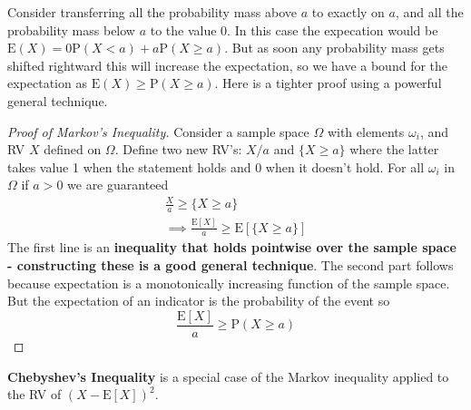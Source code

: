 Consider transferring all the probability mass above $a$ to exactly on $a$, and all the probability mass below $a$ to the value 0. In this case the expecation would be $\mathrm{E}(X) = 0\mathrm{P}(X<a)+a\mathrm{P}(X\geq a).$ But as soon any probability mass gets shifted rightward this will increase the expectation, so we have a bound for the expectation as $\mathrm{E}(X)\geq \mathrm{P}(X\geq a)$. Here is a tighter proof using a powerful general technique. 
\begin{proof}[Proof of Markov's Inequality]
Consider a sample space $\Omega$ with elements $\omega_i$, and RV $X$ defined on $\Omega$. Define two new RV's: $X/a$ and $\{X\geq a\}$ where the latter takes value 1 when the statement holds and 0 when it doesn't hold. For all $\omega_i$ in $\Omega$ if $a > 0$ we are guaranteed
\begin{align}
\frac{X}{a} \geq \{X\geq a\} \\
\implies \frac{\mathrm{E}[X]}{a} \geq \mathrm{E}[\{X\geq a\}]
\end{align}
The first line is an \textbf{inequality that holds pointwise over the sample space - constructing these is a good general technique}. The second part  follows because expectation is a monotonically increasing function of the sample space. But the expectation of an indicator is the probability of the event so
\begin{equation} 
\frac{\mathrm{E}[X]}{a} \geq \mathrm{P}(X\geq a)
\end{equation}
\end{proof}
 \textbf{Chebyshev's Inequality} is a special case of the Markov inequality applied to the RV of $(X-\mathrm{E}[X])^2$.


